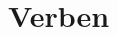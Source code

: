 \documentclass[11pt]{scrartcl}
\begin{document}
\section*{Verben}

\begin{multicols}{3}
\raggedcolumns



\end{multicols}
\end{document}

